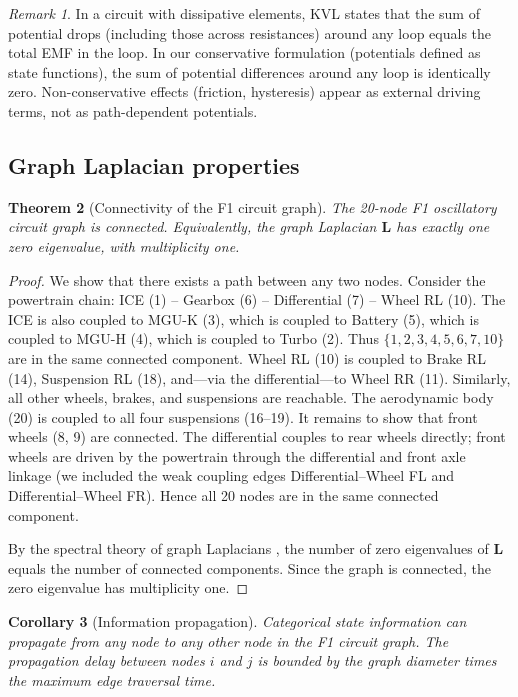 \documentclass[twocolumn,10pt,a4paper]{article}
\newtheorem{theorem}{Theorem}[section]
\newtheorem{corollary}[theorem]{Corollary}
\theoremstyle{definition}
\theoremstyle{remark}
\newtheorem{remark}[theorem]{Remark}
\newcommand{\mat}[1]{\mathbf{#1}}
\begin{document}
\begin{remark}
In a circuit with dissipative elements, KVL states that the sum of potential drops (including those across resistances) around any loop equals the total EMF in the loop. In our conservative formulation (potentials defined as state functions), the sum of potential differences around any loop is identically zero. Non-conservative effects (friction, hysteresis) appear as external driving terms, not as path-dependent potentials.
\end{remark}

\subsection{Graph Laplacian properties}

\begin{theorem}[Connectivity of the F1 circuit graph]\label{thm:connectivity}
The 20-node F1 oscillatory circuit graph is connected. Equivalently, the graph Laplacian $\mat{L}$ has exactly one zero eigenvalue, with multiplicity one.
\end{theorem}

\begin{proof}
We show that there exists a path between any two nodes. Consider the powertrain chain: ICE (1) -- Gearbox (6) -- Differential (7) -- Wheel RL (10). The ICE is also coupled to MGU-K (3), which is coupled to Battery (5), which is coupled to MGU-H (4), which is coupled to Turbo (2). Thus $\{1, 2, 3, 4, 5, 6, 7, 10\}$ are in the same connected component. Wheel RL (10) is coupled to Brake RL (14), Suspension RL (18), and---via the differential---to Wheel RR (11). Similarly, all other wheels, brakes, and suspensions are reachable. The aerodynamic body (20) is coupled to all four suspensions (16--19). It remains to show that front wheels (8, 9) are connected. The differential couples to rear wheels directly; front wheels are driven by the powertrain through the differential and front axle linkage (we included the weak coupling edges Differential--Wheel FL and Differential--Wheel FR). Hence all 20 nodes are in the same connected component.

By the spectral theory of graph Laplacians \citep{Chung1997}, the number of zero eigenvalues of $\mat{L}$ equals the number of connected components. Since the graph is connected, the zero eigenvalue has multiplicity one.
\end{proof}

\begin{corollary}[Information propagation]\label{cor:info_prop}
Categorical state information can propagate from any node to any other node in the F1 circuit graph. The propagation delay between nodes $i$ and $j$ is bounded by the graph diameter times the maximum edge traversal time.
\end{corollary}
\end{document}
